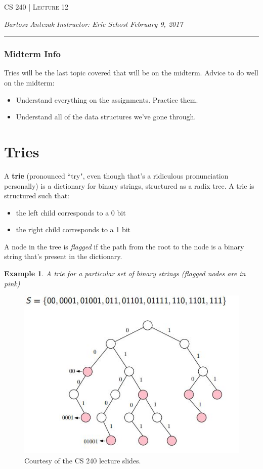 \documentclass{report}
\newcommand{\lectureNum}{12}
\newcommand{\curDate}{February 9, 2017}
\newcommand{\course}{CS 240}
\newtheorem{ex}{Example}[section]
\begin{document}
\begin{center}
\begin{Large}
\textsc{\course{} | Lecture \lectureNum{}}
\end{Large}
\end{center} 
\noindent \textit{Bartosz Antczak} \hfill
\textit{Instructor: Eric Schost} \hfill
\textit{\curDate{}}
\rule{\textwidth}{0.4pt}

\subsubsection{Midterm Info}
Tries will be the last topic covered that will be on the midterm. Advice to do well on the midterm:
\begin{itemize}
\item Understand everything on the assignments. Practice them.
\item Understand all of the data structures we've gone through.
\end{itemize}
\section{Tries}
A \textbf{trie} (pronounced ``try", even though that's a ridiculous pronunciation personally) is a dictionary for binary strings, structured as a radix tree. A trie is structured such that:
\begin{itemize}
\item the left child corresponds to a 0 bit
\item the right child corresponds to a 1 bit
\end{itemize}
A node in the tree is \textit{flagged} if the path from the root to the node is a binary string that's present in the dictionary.
\begin{ex}
A trie for a particular set of binary strings (flagged nodes are in pink)
\end{ex}
\begin{figure}[ht]
\begin{center}
\includegraphics[scale=0.75]{trie1.jpg}
\end{center}
\caption{Courtesy of the CS 240 lecture slides.}
\end{figure}
\end{document}
